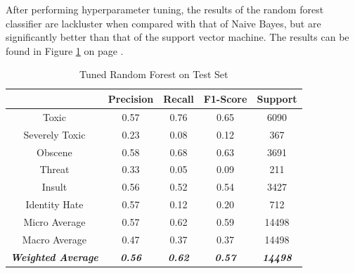 \documentclass{article}
\begin{document}
{{	  After performing hyperparameter tuning, the results of the random forest
	  classifier are lackluster when compared with that of Naive Bayes, but are
	  significantly better than that of the support vector machine. The results
	  can be found in Figure \ref{table:rf-test} on page \pageref{table:rf-test}.

	  \begin{table}[h!]
		  \centering
		  \begin{tabular}{|c|| c c c c|}
			  \hline
			                                     & Precision              & Recall                 & F1-Score               & Support                 \\ [0.5ex]
			  \hline\hline
			  Toxic                              & 0.57                   & 0.76                   & 0.65                   & 6090                    \\
			  Severely Toxic                     & 0.23                   & 0.08                   & 0.12                   & 367                     \\
			  Obscene                            & 0.58                   & 0.68                   & 0.63                   & 3691                    \\
			  Threat                             & 0.33                   & 0.05                   & 0.09                   & 211                     \\
			  Insult                             & 0.56                   & 0.52                   & 0.54                   & 3427                    \\
			  Identity Hate                      & 0.57                   & 0.12                   & 0.20                   & 712                     \\
			  \hline\hline
			  Micro Average                      & 0.57                   & 0.62                   & 0.59                   & 14498                   \\
			  Macro Average                      & 0.47                   & 0.37                   & 0.37                   & 14498                   \\
			  \textit{\textbf{Weighted Average}} & \textit{\textbf{0.56}} & \textit{\textbf{0.62}} & \textit{\textbf{0.57}} & \textit{\textbf{14498}} \\

			  \hline
		  \end{tabular}
		  \caption{Tuned Random Forest on Test Set}
		  \label{table:rf-test}
	  \end{table}
  }

}
\end{document}
